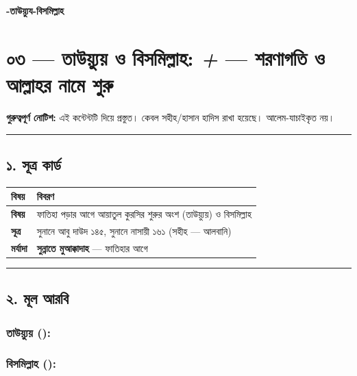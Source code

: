 

\begin{center}{\Large\bfseries\color{emerald} -তাউয়্যুয-বিসমিল্লাহ}\end{center}
\vspace{1em}
\section*{০৩ — তাউয়্যুয় ও বিসমিল্লাহ: \textit{ + } — শরণাগতি ও আল্লাহর নামে শুরু}

\begin{warnbox}
 \textbf{গুরুত্বপূর্ণ নোটিশ:} এই কন্টেন্টটি  দিয়ে প্রস্তুত। কেবল সহীহ/হাসান হাদিস রাখা হয়েছে। আলেম-যাচাইকৃত নয়।
\end{warnbox}

\medskip\hrule\medskip

\subsection*{১. সূত্র কার্ড}

\begin{table}[h]\centering\small
\begin{tabular}{ll}
বিষয় & বিবরণ \\
\hline
\textbf{বিষয়} & ফাতিহা পড়ার আগে আয়াতুল কুরসির শুরুর অংশ (তাউয়্যুয়) ও বিসমিল্লাহ \\
\textbf{সূত্র} & সুনানে আবু দাউদ ১৪৫, সুনানে নাসায়ী ১৬১ (সহীহ — আলবানি) \\
\textbf{মর্যাদা} & \textbf{সুন্নাতে মুআক্কাদাহ} — ফাতিহার আগে \\
\hline
\end{tabular}
\end{table}

\medskip\hrule\medskip

\subsection*{২. মূল আরবি}

\subsubsection*{\textbf{তাউয়্যুয় ():}}
\begin{center}\end{center}

\subsubsection*{\textbf{বিসমিল্লাহ ():}}
\begin{center}\end{center}


